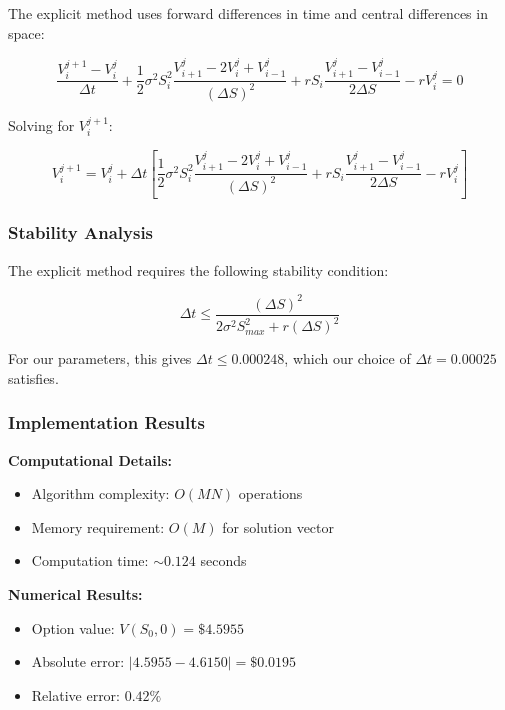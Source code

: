 \documentclass[12pt,a4paper]{article}
\numberwithin{algorithm}{subsection}
\begin{document}
The explicit method uses forward differences in time and central differences in space:

\begin{equation}
\frac{V_i^{j+1} - V_i^j}{\Delta t} + \frac{1}{2}\sigma^2 S_i^2 \frac{V_{i+1}^j - 2V_i^j + V_{i-1}^j}{(\Delta S)^2} + rS_i \frac{V_{i+1}^j - V_{i-1}^j}{2\Delta S} - rV_i^j = 0
\end{equation}

Solving for $V_i^{j+1}$:

\begin{equation}
V_i^{j+1} = V_i^j + \Delta t \left[ \frac{1}{2}\sigma^2 S_i^2 \frac{V_{i+1}^j - 2V_i^j + V_{i-1}^j}{(\Delta S)^2} + rS_i \frac{V_{i+1}^j - V_{i-1}^j}{2\Delta S} - rV_i^j \right]
\end{equation}

\subsubsection{Stability Analysis}

The explicit method requires the following stability condition:

\begin{equation}
\Delta t \leq \frac{(\Delta S)^2}{2\sigma^2 S_{max}^2 + r(\Delta S)^2}
\end{equation}

For our parameters, this gives $\Delta t \leq 0.000248$, which our choice of $\Delta t = 0.00025$ satisfies.

\subsubsection{Implementation Results}

\textbf{Computational Details:}
\begin{itemize}
\item Algorithm complexity: $O(MN)$ operations
\item Memory requirement: $O(M)$ for solution vector
\item Computation time: $\sim 0.124$ seconds
\end{itemize}

\textbf{Numerical Results:}
\begin{itemize}
\item Option value: $V(S_0, 0) = \$4.5955$
\item Absolute error: $|4.5955 - 4.6150| = \$0.0195$
\item Relative error: $0.42\%$
\end{itemize}
\end{document}
